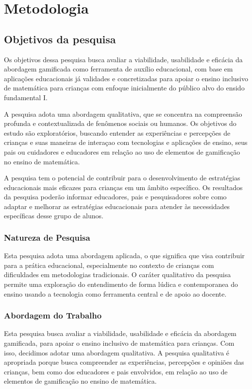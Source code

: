 

\chapter{Metodologia}\label{chp:met}


\section{Objetivos da pesquisa}

Os objetivos dessa pesquisa busca avaliar a viabilidade, usabilidade e eficácia da abordagem gamificada como ferramenta de auxílio educacional, com base em aplicações educacionais já validades e concretizadas para apoiar o ensino inclusivo de matemática para crianças com enfoque inicialmente do público alvo do ensido fundamental I.

A pesquisa adota uma abordagem qualitativa, que se concentra na compreensão profunda e contextualizada de fenômenos sociais ou humanos. Os objetivos do estudo são exploratórios, buscando entender as experiências e percepções de crianças e suas maneiras de interaçao com tecnologias e aplicações de ensino, seus pais ou cuidadores e educadores em relação ao uso de elementos de gamificação no ensino de matemática.

A pesquisa tem o potencial de contribuir para o desenvolvimento de estratégias educacionais mais eficazes para crianças em um âmbito específico. Os resultados da pesquisa poderão informar educadores, pais e pesquisadores sobre como adaptar e melhorar as estratégias educacionais para atender às necessidades específicas desse grupo de alunos.

\subsection{Natureza de Pesquisa}
    
    Esta pesquisa adota uma abordagem aplicada, o que significa que visa contribuir para a prática educacional, especialmente no contexto de crianças com dificuldades em metodologias tradicionais. O caráter qualitativo da pesquisa permite uma exploração do entendimento de forma lúdica e contemporanea do ensino usando a tecnologia como ferramenta central e de apoio ao docente.
\subsection{Abordagem do Trabalho}
    
    Esta pesquisa busca avaliar a viabilidade, usabilidade e eficácia da abordagem gamificada, para apoiar o ensino inclusivo de matemática para crianças. Com isso, decidimos adotar uma abordagem qualitativa. A pesquisa qualitativa é apropriada porque busca compreender as experiências, percepções e opiniões das crianças, bem como dos educadores e pais envolvidos, em relação ao uso de elementos de gamificação no ensino de matemática.


